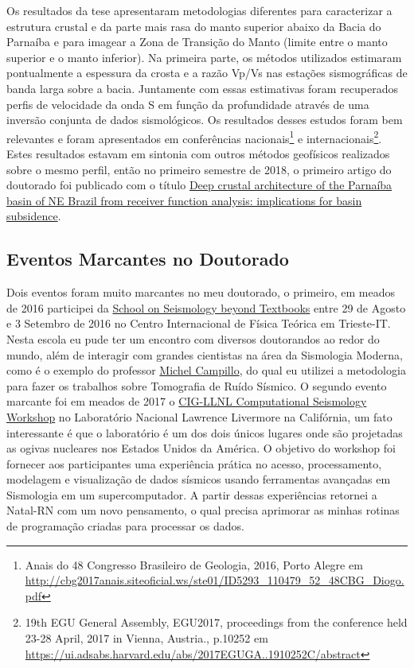 \documentclass[10pt,a4paper,oneside]{book}
\begin{document}
Os resultados da tese apresentaram metodologias diferentes para caracterizar a estrutura crustal e da parte mais rasa do manto superior abaixo da Bacia do Parnaíba e para imagear a Zona de Transição do Manto (limite entre o manto superior e o manto inferior). Na primeira parte, os métodos utilizados estimaram pontualmente a espessura da crosta e a razão Vp/Vs nas estações sismográficas de banda larga sobre a bacia. Juntamente com essas estimativas foram recuperados perfis de velocidade da onda S em função da profundidade através de uma inversão conjunta de dados sismológicos. Os resultados desses estudos foram bem relevantes e foram apresentados em conferências nacionais\footnote{Anais do 48 Congresso Brasileiro de Geologia, 2016, Porto Alegre em \url{http://cbg2017anais.siteoficial.ws/ste01/ID5293_110479_52_48CBG_Diogo.pdf}} e internacionais\footnote{19th EGU General Assembly, EGU2017, proceedings from the conference held 23-28 April, 2017 in Vienna, Austria., p.10252 em \url{https://ui.adsabs.harvard.edu/abs/2017EGUGA..1910252C/abstract}}. Estes resultados estavam em sintonia com outros métodos geofísicos realizados sobre o mesmo perfil, então no primeiro semestre de 2018, o primeiro artigo do doutorado foi publicado com o título \href{https://doi.org/10.1144/SP472.8}{Deep crustal architecture of the Parnaíba basin of NE Brazil from receiver function analysis: implications for basin subsidence}.

\subsection{Eventos Marcantes no Doutorado}
\label{sec_ev_doc}

Dois eventos foram muito marcantes no meu doutorado, o primeiro, em meados de 2016 participei da \href{https://indico.ictp.it/event/7615/material/11/0.jpg}{School on Seismology beyond Textbooks} entre 29 de Agosto e 3 Setembro de 2016 no Centro Internacional de Física Teórica em Trieste-IT. Nesta escola eu pude ter um encontro com diversos doutorandos ao redor do mundo, além de interagir com grandes cientistas na área da Sismologia Moderna, como é o exemplo do professor \href{https://scholar.google.fr/citations?user=ZCRP01AAAAAJ&hl=fr}{Michel Campillo}, do qual eu utilizei a metodologia para fazer os trabalhos sobre Tomografia de Ruído Sísmico. O segundo evento marcante foi em meados de 2017 o \href{https://geodynamics.org/events/details/218}{CIG-LLNL Computational Seismology Workshop} no Laboratório Nacional Lawrence Livermore na Califórnia, um fato interessante é que o laboratório é um dos dois únicos lugares onde são projetadas as ogivas nucleares nos Estados Unidos da América. O objetivo do workshop foi fornecer aos participantes uma experiência prática no acesso, processamento, modelagem e visualização de dados sísmicos usando ferramentas avançadas em Sismologia em um supercomputador. A partir dessas experiências retornei a Natal-RN com um novo pensamento, o qual precisa aprimorar as minhas rotinas de programação criadas para processar os dados. 
\end{document}
